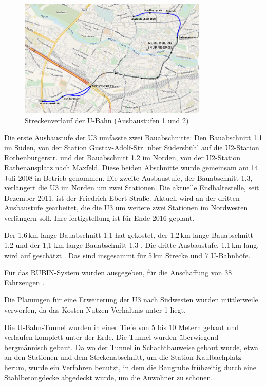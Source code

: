 \begin{figure}[h]
  \begin{center}
    \includegraphics[width=0.8\textwidth]{maps/Nuernberg.png}
    \caption{Streckenverlauf der U-Bahn (Ausbaustufen 1 und 2)}
  \end{center}
\end{figure}

Die erste Ausbaustufe der U3 umfasste zwei Bauabschnitte: Den Bauabschnitt 1.1 im Süden, von der Station Gustav-Adolf-Str. über Südersbühl auf die U2-Station Rothenburgerstr. und der Bauabschnitt 1.2 im Norden, von der U2-Station Rathenausplatz nach Maxfeld. Diese beiden Abschnitte wurde gemeinsam am 14. Juli 2008 in Betrieb genommen. Die zweite Ausbaustufe, der Bauabschnitt 1.3, verlängert die U3 im Norden um zwei Stationen. Die aktuelle Endhaltestelle, seit Dezember 2011, ist der Friedrich-Ebert-Straße. Aktuell wird an der dritten Ausbaustufe gearbeitet, die die U3 um weitere zwei Stationen im Nordwesten verlängern soll. Ihre fertigstellung ist für Ende 2016 geplant\cite{nbNord3}.

Der 1,6\,km lange Bauabschnitt 1.1 hat  gekostet, der 1,2\,km lange Bauabschnitt 1.2  und der 1,1 km lange Bauabschnitt 1.3  \cite{nbBr}. Die dritte Ausbaustufe, 1.1\,km lang, wird auf  geschätzt \cite{nbNord3}. Das sind insgesammt  für 5\,km Strecke und 7 U-Bahnhöfe. 

Für das RUBIN-System wurden  ausgegeben, für die Anschaffung von 38 Fahrzeugen  \cite{nSi}.

Die Planungen für eine Erweiterung der U3 nach Südwesten wurden mittlerweile verworfen, da das Kosten-Nutzen-Verhältnis unter 1 liegt.

Die U-Bahn-Tunnel wurden in einer Tiefe von 5 bis 10 Metern gebaut und verlaufen komplett unter der Erde\cite{nbRef3}. Die Tunnel wurden überwiegend berg\-männ\-isch gebaut. Da wo der Tunnel in Schachtbauweise gebaut wurde, etwa an den Stationen und dem Strckenabschnitt, um die Station Kaulbachplatz herum, wurde ein Verfahren benutzt, in dem die Baugrube frühzeitig durch eine Stahlbetongdecke abgedeckt wurde, um die Anwohner zu schonen\cite{nbBr}. 

